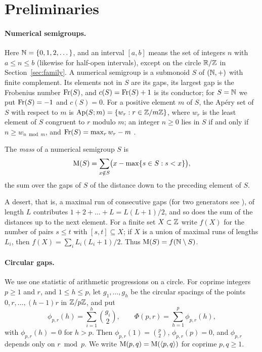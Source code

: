 \section{Preliminaries}\label{sec:prelim}

\paragraph{Numerical semigroups.} Here $\mathbb{N}=\{0,1,2,\dots\}$, and an interval $[a,b]$ means the set of integers $n$ with $a\le n\le b$ (likewise for half-open intervals), except on the circle $\mathbb R/\mathbb{Z}$ in Section~\ref{sec:family}. A numerical semigroup is a submonoid $S$ of $(\mathbb{N},+)$ with finite complement. Its elements not in $S$ are its gaps, its largest gap is the Frobenius number $\operatorname{Fr}(S)$, and $c(S)=\operatorname{Fr}(S)+1$ is its conductor; for $S=\mathbb{N}$ we put $\operatorname{Fr}(S)=-1$ and $c(S)=0$. For a positive element $m$ of $S$, the Ap\'ery set of $S$ with respect to $m$ is $\operatorname{Ap}(S;m)=\{w_r:r\in\mathbb{Z}/m\mathbb{Z}\}$, where $w_r$ is the least element of $S$ congruent to $r$ modulo $m$; an integer $n\ge0$ lies in $S$ if and only if $n\ge w_{n\bmod m}$, and $\operatorname{Fr}(S)=\max_r w_r-m$ \cite{RosalesGarciaSanchez2009}.

\begin{definition}[Mass]\label{def:mass}
The \emph{mass} of a numerical semigroup $S$ is
\[
\operatorname{M}(S)=\sum_{x\notin S}\bigl(x-\max\{s\in S: s<x\}\bigr),
\]
the sum over the gaps of $S$ of the distance down to the preceding element of $S$.
\end{definition}

A desert, that is, a maximal run of consecutive gaps \cite{NumericalSgps} (for two generators see \cite[Sect.~6]{Moree2014}), of length $L$ contributes $1+2+\dots+L=L(L+1)/2$, and so does the sum of the distances up to the next element. For a finite set $X\subset\mathbb{Z}$ write $f(X)$ for the number of pairs $s\le t$ with $[s,t]\subseteq X$; if $X$ is a union of maximal runs of lengths $L_i$, then $f(X)=\sum_i L_i(L_i+1)/2$. Thus $\operatorname{M}(S)=f(\mathbb{N}\setminus S)$.

\paragraph{Circular gaps.} We use one statistic of arithmetic progressions on a circle. For coprime integers $p\ge1$ and $r$, and $1\le h\le p$, let $g_1,\dots,g_h$ be the circular spacings of the points $0,r,\dots,(h-1)r$ in $\mathbb{Z}/p\mathbb{Z}$, and put
\[
\phi_{p,r}(h)=\sum_{i=1}^h\binom{g_i}2,\qquad\Phi(p,r)=\sum_{h=1}^p\phi_{p,r}(h),
\]
with $\phi_{p,r}(h)=0$ for $h>p$. Then $\phi_{p,r}(1)=\binom p2$, $\phi_{p,r}(p)=0$, and $\phi_{p,r}$ depends only on $r\bmod p$. We write $\operatorname{M}(p,q)=\operatorname{M}(\langle p,q\rangle)$ for coprime $p,q\ge1$.

